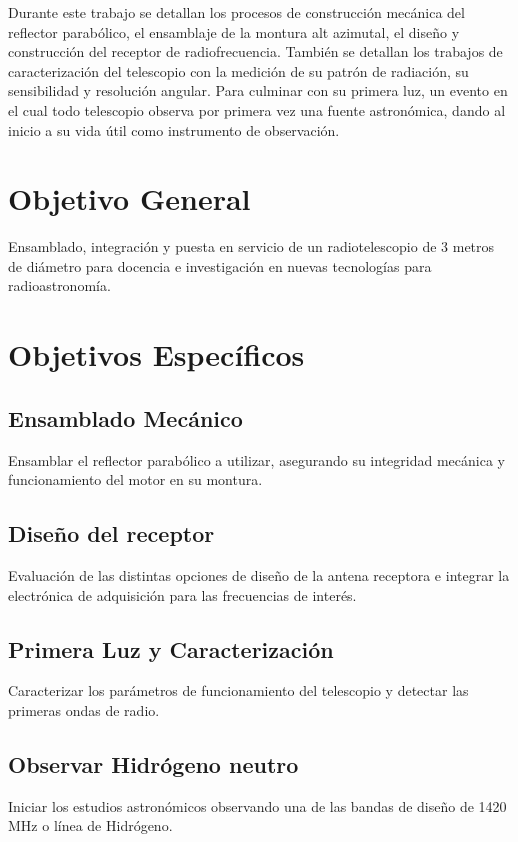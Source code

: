 Durante este trabajo se detallan los procesos de construcción mecánica del reflector parabólico, el ensamblaje de la montura alt azimutal, el diseño y construcción del receptor de radiofrecuencia. También se detallan los trabajos de caracterización del telescopio con la medición de su patrón de radiación, su sensibilidad y resolución angular. Para culminar con su primera luz, un evento en el cual todo telescopio observa por primera vez una fuente astronómica, dando al inicio a su vida útil como instrumento de observación.\\


\section{Objetivo General}
Ensamblado, integración y puesta en servicio de un radiotelescopio de 3 metros de diámetro para docencia e investigación en nuevas tecnologías para radioastronomía.

\section{Objetivos Específicos}
\subsection{Ensamblado Mecánico}

Ensamblar el reflector parabólico a utilizar, asegurando su integridad mecánica y funcionamiento del motor en su montura.

\subsection{Diseño del receptor}

Evaluación de las distintas opciones de diseño de la antena receptora e integrar la electrónica de adquisición para las frecuencias de interés.

\subsection{Primera Luz y Caracterización}

Caracterizar los parámetros de funcionamiento del telescopio y detectar las primeras ondas de radio.

\subsection{Observar Hidrógeno neutro}


Iniciar los estudios astronómicos observando una de las bandas de diseño de 1420 MHz o línea de Hidrógeno.